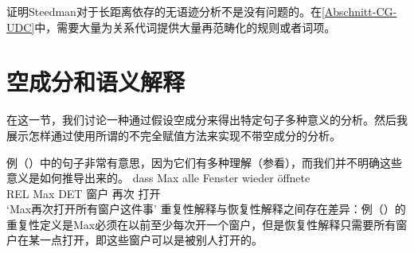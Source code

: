 \citet{Pollard88a}证明Steedman对于长距离依存的无语迹分析不是没有问题的。在\ref{Abschnitt-CG-UDC}中，需要大量为关系代词提供大量再范畴化的规则或者词项。

\section{空成分和语义解释}
\label{Abschnitt-leere-Elemente-Semantik}
\label{sec-MRS-wieder}

在这一节，我们讨论一种通过假设空成分来得出特定句子多种意义的分析。然后我展示怎样通过使用所谓的不完全赋值方法来实现不带空成分的分析。

例（）中的句子非常有意思，因为它们有多种理解（参看\citealp[\S~5.6]{Dowty79a}），而我们并不明确这些意义是如何推导出来的。
\ea
\label{ex-alle-wieder}
\gll dass Max alle Fenster wieder öffnete\\
	 REL Max DET 窗户 再次 打开\\
\glt `Max再次打开所有窗户这件事'
\z
重复性解释与恢复性解释之间存在差异：例（）的重复性定义是Max必须在以前至少每次开一个窗户，但是恢复性解释只需要所有窗户在某一点打开，即这些窗户可以是被别人打开的。

